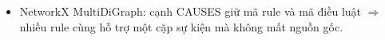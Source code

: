 \begin{frame}
\begin{columns}[T,onlytextwidth]
\vspace{0.1cm}
\begin{itemize}
  \item NetworkX MultiDiGraph: cạnh CAUSES giữ mã rule và mã điều luật
        $\Rightarrow$ nhiều rule cùng hỗ trợ một cặp sự kiện mà không mất nguồn gốc.
\end{itemize}
\end{columns}

\vspace{0.1cm}
\end{frame}

